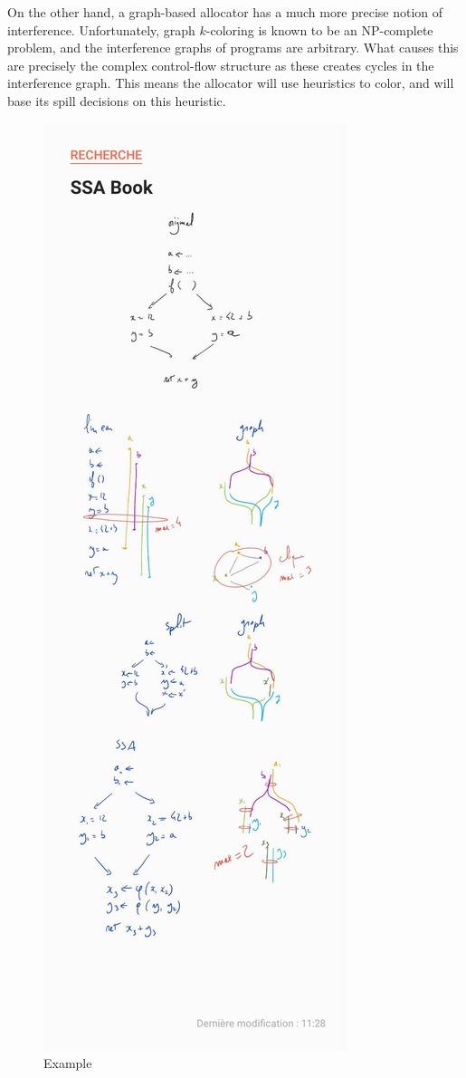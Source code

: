 {On the other hand, a graph-based allocator has a much more precise notion of interference.
Unfortunately, graph $k$-coloring is known to be an NP-complete problem, and the interference graphs of programs are arbitrary.
What causes this are precisely the complex control-flow structure as these creates cycles in the interference graph.
This means the allocator will use heuristics to color, and will base its spill decisions on this heuristic.

\begin{figure}
  \includegraphics[height=\textheight]{figures/example-initial}
  \caption{Example}
  \label{fig:ra:running}
\end{figure}

}
